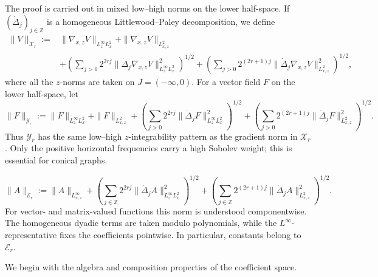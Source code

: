 \documentclass[12pt]{amsart}
\theoremstyle{remark}
\theoremstyle{definition}
\numberwithin{equation}{section}
\begin{document}
The proof is carried out in mixed low--high norms on the lower half-space.
If \((\dot\Delta_j)_{j\in\mathbb Z}\) is a homogeneous Littlewood--Paley decomposition, we define
\begin{equation*}
\begin{aligned}
 \|V\|_{\mathcal X_r} :={}& \|\nabla_{x,z}V\|_{L^\infty_zL^2_x} +\|\nabla_{x,z}V\|_{L^2_{x,z}}\\
 &+ \left( \sum_{j>0}2^{2rj} \|\dot\Delta_j\nabla_{x,z}V\|_{L^\infty_zL^2_x}^2 \right)^{1/2}+ \left( \sum_{j>0}2^{(2r+1)j} \|\dot\Delta_j\nabla_{x,z}V\|_{L^2_{x,z}}^2 \right)^{1/2},
\end{aligned}
\end{equation*}
where all the \(z\)-norms are taken on \(J=(-\infty,0)\).
For a vector field \(F\) on the lower half-space, let
\begin{equation*}
 \|F\|_{\mathcal Y_r} := \|F\|_{L^\infty_zL^2_x} + \|F\|_{L^2_{x,z}}+ \left( \sum_{j>0}2^{2rj} \|\dot\Delta_jF\|_{L^\infty_zL^2_x}^2 \right)^{1/2}+ \left( \sum_{j>0}2^{(2r+1)j} \|\dot\Delta_jF\|_{L^2_{x,z}}^2 \right)^{1/2}.
\end{equation*}
Thus \(\mathcal Y_r\) has the same low--high \(z\)-integrability pattern as the gradient norm in \(\mathcal X_r\).
Only the positive horizontal frequencies carry a high Sobolev weight; this is essential for conical graphs.

\begin{equation*}
 \|A\|_{\mathcal E_r} :=\|A\|_{L^\infty_{x,z}}+ \left( \sum_{j\in\mathbb Z}2^{2rj} \|\dot\Delta_jA\|_{L^\infty_zL^2_x}^2 \right)^{1/2}+ \left( \sum_{j\in\mathbb Z}2^{(2r+1)j} \|\dot\Delta_jA\|_{L^2_{x,z}}^2 \right)^{1/2}.
\end{equation*}
For vector- and matrix-valued functions this norm is understood componentwise.
The homogeneous dyadic terms are taken modulo polynomials, while the \(L^\infty\)-representative fixes the coefficients pointwise.
In particular, constants belong to \(\mathcal E_r\).

We begin with the algebra and composition properties of the coefficient space.
\end{document}
